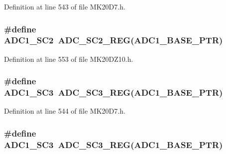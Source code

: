 Definition at line 543 of file M\+K20\+D7.\+h.

\subsubsection[{\texorpdfstring{A\+D\+C1\+\_\+\+S\+C2}{ADC1_SC2}}]{\setlength{\rightskip}{0pt plus 5cm}\#define A\+D\+C1\+\_\+\+S\+C2~{\bf A\+D\+C\+\_\+\+S\+C2\+\_\+\+R\+EG}({\bf A\+D\+C1\+\_\+\+B\+A\+S\+E\+\_\+\+P\+TR})}\hypertarget{group___a_d_c___register___accessor___macros_gac7ef0831f8f7d17b7e39eed2535b2c5d}{}\label{group___a_d_c___register___accessor___macros_gac7ef0831f8f7d17b7e39eed2535b2c5d}


Definition at line 553 of file M\+K20\+D\+Z10.\+h.

\subsubsection[{\texorpdfstring{A\+D\+C1\+\_\+\+S\+C3}{ADC1_SC3}}]{\setlength{\rightskip}{0pt plus 5cm}\#define A\+D\+C1\+\_\+\+S\+C3~{\bf A\+D\+C\+\_\+\+S\+C3\+\_\+\+R\+EG}({\bf A\+D\+C1\+\_\+\+B\+A\+S\+E\+\_\+\+P\+TR})}\hypertarget{group___a_d_c___register___accessor___macros_ga8b7119f850858d91933a39b9ea3b32c5}{}\label{group___a_d_c___register___accessor___macros_ga8b7119f850858d91933a39b9ea3b32c5}


Definition at line 544 of file M\+K20\+D7.\+h.

\subsubsection[{\texorpdfstring{A\+D\+C1\+\_\+\+S\+C3}{ADC1_SC3}}]{\setlength{\rightskip}{0pt plus 5cm}\#define A\+D\+C1\+\_\+\+S\+C3~{\bf A\+D\+C\+\_\+\+S\+C3\+\_\+\+R\+EG}({\bf A\+D\+C1\+\_\+\+B\+A\+S\+E\+\_\+\+P\+TR})}\hypertarget{group___a_d_c___register___accessor___macros_ga8b7119f850858d91933a39b9ea3b32c5}{}\label{group___a_d_c___register___accessor___macros_ga8b7119f850858d91933a39b9ea3b32c5}


